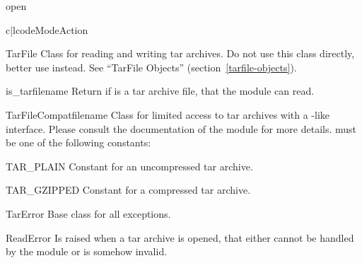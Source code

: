 \begin{funcdesc}{open}{}
    \begin{tableii}{c|l}{code}{Mode}{Action}
    \end{tableii}
\end{funcdesc}

\begin{classdesc*}{TarFile}
    Class for reading and writing tar archives. Do not use this
    class directly, better use  instead.
    See ``TarFile Objects'' (section~\ref{tarfile-objects}).
\end{classdesc*}

\begin{funcdesc}{is_tarfile}{name}
    Return  if  is a tar archive file, that
    the  module can read.
\end{funcdesc}

\begin{classdesc}{TarFileCompat}{filename}
    Class for limited access to tar archives with a
    -like interface. Please consult the
    documentation of the  module for more details.
     must be one of the following constants:
    \begin{datadesc}{TAR_PLAIN}
        Constant for an uncompressed tar archive.
    \end{datadesc}
    \begin{datadesc}{TAR_GZIPPED}
        Constant for a  compressed tar archive.
    \end{datadesc}
\end{classdesc}

\begin{excdesc}{TarError}
    Base class for all  exceptions.
\end{excdesc}

\begin{excdesc}{ReadError}
    Is raised when a tar archive is opened, that either cannot be handled by
    the  module or is somehow invalid.
\end{excdesc}

